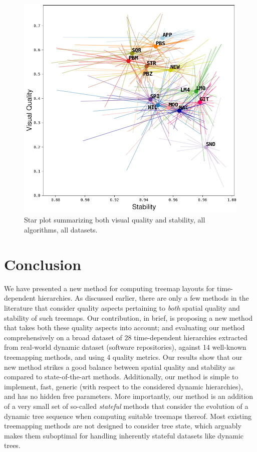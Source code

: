 \begin{figure}[htbp!]
  \includegraphics[width=1.0\linewidth]{figures/treemap-algorithm/star.png}
\caption{Star plot summarizing both visual quality and stability, all algorithms, all datasets.}
\label{fig:star-3}
\end{figure}

\section{Conclusion}
\label{sec:conclusion-3}
We have presented a new method for computing treemap layouts for time-dependent hierarchies. As discussed earlier, there are only a few methods in the literature that consider quality aspects pertaining to \emph{both} spatial quality and stability of such treemaps. Our contribution, in brief, is proposing a new method that takes both these quality aspects into account; and evaluating our method comprehensively on a broad dataset of 28 time-dependent hierarchies extracted from real-world dynamic dataset (software repositories), against 14 well-known treemapping methods, and using 4 quality metrics. Our results show that our new method strikes a good balance between spatial quality and stability as compared to state-of-the-art methods. Additionally, our method is simple to implement, fast, generic (with respect to the considered dynamic hierarchies), and has no hidden free parameters. More importantly, our method is an addition of a very small set of so-called \emph{stateful} methods that consider the evolution of a dynamic tree sequence when computing suitable treemaps thereof. Most existing treemapping methods are not designed to consider tree state, which arguably makes them suboptimal for handling inherently stateful datasets like dynamic trees.

